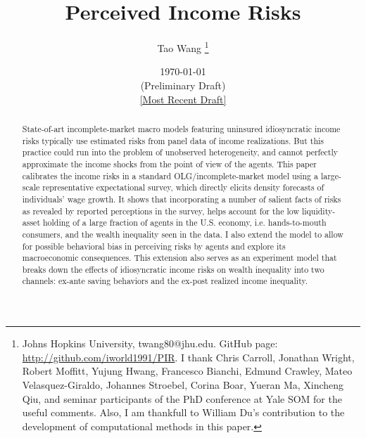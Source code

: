 \begin{titlepage}
 \title{Perceived Income Risks}
 
 \author{Tao Wang \thanks{Johns Hopkins University, twang80@jhu.edu. GitHub page: \url{http://github.com/iworld1991/PIR}. I thank Chris Carroll, Jonathan Wright, Robert Moffitt, Yujung Hwang, Francesco Bianchi, Edmund Crawley, Mateo Velasquez-Giraldo, Johannes Stroebel, Corina Boar, Yueran Ma, Xincheng Qiu, and seminar participants of the PhD conference at Yale SOM for the useful comments. Also, I am thankfull to William Du's contribution to the development of computational methods in this paper.}}

\date{\today \\(Preliminary Draft) \\\href{https://github.com/iworld1991/PIR/blob/master/PIR.pdf}{[Most Recent Draft]}}
	\maketitle
	\begin{abstract}
	\begin{singlespace}
		\noindent State-of-art incomplete-market macro models featuring uninsured idiosyncratic income risks typically use estimated risks from panel data of income realizations. But this practice could run into the problem of unobserved heterogeneity, and cannot perfectly approximate the income shocks from the point of view of the agents. This paper calibrates the income risks in a standard OLG/incomplete-market model using a large-scale representative expectational survey, which directly elicits density forecasts of individuals' wage growth. It shows that incorporating a number of salient facts of risks as revealed by reported perceptions in the survey, helps account for the low liquidity-asset holding of a large fraction of agents in the U.S. economy, i.e. hands-to-mouth consumers, and the wealth inequality seen in the data. I also extend the model to allow for possible behavioral bias in perceiving risks by agents and explore its macroeconomic consequences. This extension also serves as an experiment model that breaks down the effects of idiosyncratic income risks on wealth inequality into two channels: ex-ante saving behaviors and the ex-post realized income inequality.
		

\end{singlespace}
\end{abstract}
\end{titlepage}
